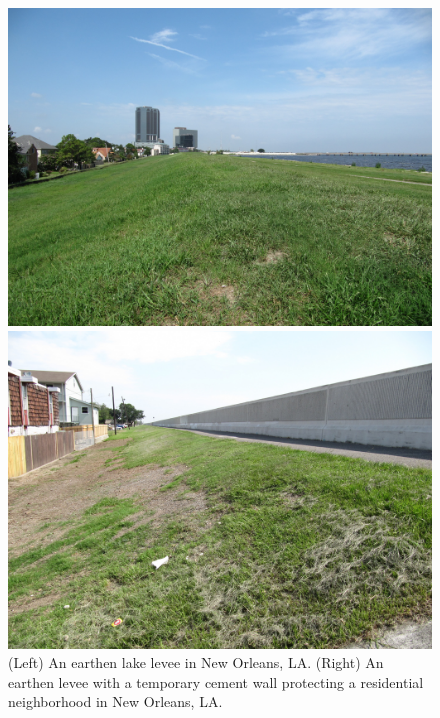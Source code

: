 \begin{figure}[t]
  \centering
  \begin{minipage}{0.49\textwidth}
    \includegraphics[width=1.0\textwidth]{images/GrassyLakeLevee.jpg}
  \end{minipage}
  \begin{minipage}{0.49\textwidth}
    \includegraphics[width=1.0\textwidth]{images/DryLeveeWithRetainingWall.jpg}
  \end{minipage}
    \caption[Levees in New Orleans, LA]{(Left) An earthen lake levee in New Orleans, LA. (Right) An earthen levee with a temporary cement wall protecting a residential neighborhood in New Orleans, LA.}
    \label{figure:levees}
\end{figure}



